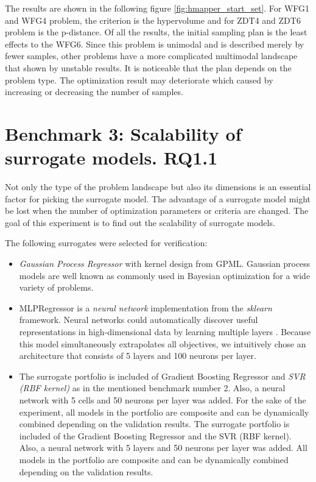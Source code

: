     The results are shown in the following figure \ref{fig:hmapper_start_set}. 
    For WFG1 and WFG4 problem, the criterion is the hypervolume and for ZDT4 and ZDT6 problem is the p-distance. Of all the results, the initial sampling plan is the least effects to the WFG6. Since this problem is unimodal and is described merely by fewer samples, other problems have a more complicated multimodal landscape that shown by unstable results. It is noticeable that the plan depends on the problem type. The optimization result may deteriorate which caused by increasing or decreasing the number of samples.

   



\section{Benchmark 3: Scalability of surrogate models. RQ1.1}
    Not only the type of the problem landscape but also its dimensions is an essential factor for picking the surrogate model. The advantage of a surrogate model might be lost when the number of optimization parameters or criteria are changed. The goal of this experiment is to find out the scalability of surrogate models. 


    The following surrogates were selected for verification:
    \begin{itemize}
        \item \emph{Gaussian Process Regressor} with kernel design from GPML\cite{RasmussenN10}. Gaussian process models are well known as commonly used in Bayesian optimization for a wide variety of problems. 
        \item MLPRegressor is a \emph{neural network} implementation from the \textit{sklearn} framework. Neural networks could automatically discover useful representations in high-dimensional data by learning multiple layers \cite{WilsonHSX16}. Because this model simultaneously extrapolates all objectives, we intuitively chose an architecture that consists of 5 layers and 100 neurons per layer.
        \item The surrogate portfolio is included of Gradient Boosting Regressor and \emph{SVR (RBF kernel)} as in the mentioned benchmark number 2. Also, a neural network with 5 cells and 50 neurons per layer was added. For the sake of the experiment, all models in the portfolio are composite and can be dynamically combined depending on the validation results. The surrogate portfolio is included of the Gradient Boosting Regressor and the SVR (RBF kernel). Also, a neural network with 5 layers and 50 neurons per layer was added. All models in the portfolio are composite and can be dynamically combined depending on the validation results.
    \end{itemize}

